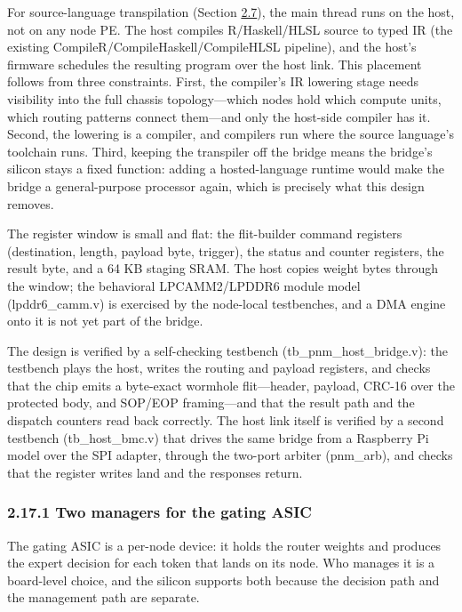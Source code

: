 \documentclass[10pt,twocolumn]{article}
\begin{document}
For source-language transpilation (Section \hyperref[sec:2.7]{2.7}), the main thread runs on the host, not on any node PE. The host compiles R/Haskell/HLSL source to typed IR (the existing CompileR/CompileHaskell/CompileHLSL pipeline), and the host's firmware schedules the resulting program over the host link. This placement follows from three constraints. First, the compiler's IR lowering stage needs visibility into the full chassis topology---which nodes hold which compute units, which routing patterns connect them---and only the host-side compiler has it. Second, the lowering is a compiler, and compilers run where the source language's toolchain runs. Third, keeping the transpiler off the bridge means the bridge's silicon stays a fixed function: adding a hosted-language runtime would make the bridge a general-purpose processor again, which is precisely what this design removes.

The register window is small and flat: the flit-builder command registers (destination, length, payload byte, trigger), the status and counter registers, the result byte, and a 64 KB staging SRAM. The host copies weight bytes through the window; the behavioral LPCAMM2/LPDDR6 module model (lpddr6\_camm.v) is exercised by the node-local testbenches, and a DMA engine onto it is not yet part of the bridge.

The design is verified by a self-checking testbench (tb\_pnm\_host\_bridge.v): the testbench plays the host, writes the routing and payload registers, and checks that the chip emits a byte-exact wormhole flit---header, payload, CRC-16 over the protected body, and SOP/EOP framing---and that the result path and the dispatch counters read back correctly. The host link itself is verified by a second testbench (tb\_host\_bmc.v) that drives the same bridge from a Raspberry Pi model over the SPI adapter, through the two-port arbiter (pnm\_arb), and checks that the register writes land and the responses return.

\subsubsection*{2.17.1 Two managers for the gating ASIC}\label{sec:2.17.1}

The gating ASIC is a per-node device: it holds the router weights and produces the expert decision for each token that lands on its node. Who manages it is a board-level choice, and the silicon supports both because the decision path and the management path are separate.
\end{document}
